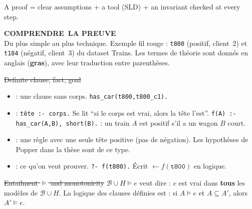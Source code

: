 \documentclass[10pt]{article}
\begin{document}
\begin{tcolorbox}[colback=marine, colframe=marine, arc=0pt, boxrule=0pt,
  halign=center, top=3pt, bottom=3pt]
\color{white}\small A proof = clear assumptions + a tool (SLD) + an invariant checked at every step.
\end{tcolorbox}

\detailpages

{\fontsize{24}{26}\selectfont\bfseries\textcolor{marine}{COMPRENDRE}~LA PREUVE}\\[2pt]
{\normalsize Du plus simple au plus technique. Exemple fil rouge : \texttt{t800} (positif, client~2)
et \texttt{t184} (négatif, client~3) du dataset Trains. Les termes de théorie sont donnés en anglais
(\textcolor{marine}{\textbf{gras}}), avec leur traduction entre parenthèses.}


\st{Definite clause, fact, goal}
\begin{itemize}
  \item {} : une clause sans corps. \texttt{has\_car(t800,t800\_c1).}
  \item {} : \texttt{tête :- corps.} Se lit ``si le corps est vrai, alors la tête l'est''.
        \texttt{f(A) :- has\_car(A,B), short(B).} : un train $A$ est positif s'il a un wagon $B$ court.
  \item {} : une règle avec une seule tête positive (pas de négation).
        Les hypothèses de Popper dans la thèse sont de ce type.
  \item {} : ce qu'on veut prouver. \texttt{?- f(t800).} Écrit $\leftarrow f(\texttt{t800})$ en logique.
\end{itemize}

\st{Entailment $\models$ and monotonicity}
$\mathcal{B}\cup H\models e$ veut dire : $e$ est vrai dans \textbf{tous} les modèles de $\mathcal{B}\cup H$.
La logique des clauses définies est  : si $A\models e$ et $A\subseteq A'$, alors $A'\models e$.
\end{document}
